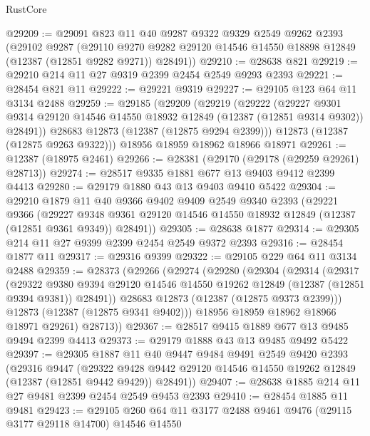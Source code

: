 \begin{lexlean}{RustCore}
\begin{coremodule}
@29209 := @29091
    @823
    @11
    @40
    @9287
    @9322
    @9329
    @2549
    @9262
    @2393
    (@29102
      @9287
      (@29110 @9270 @9282 @29120 @14546 @14550 @18898 @12849 (@12387 (@12851 @9282 @9271)) @28491))
@29210 := @28638 @821
@29219 := @29210 @214 @11 @27 @9319 @2399 @2454 @2549 @9293 @2393
@29221 := @28454 @821 @11
@29222 := @29221 @9319
@29227 := @29105 @123 @64 @11 @3134 @2488
@29259 := @29185
    (@29209
      (@29219
        (@29222
          (@29227
            @9301
            @9314
            @29120
            @14546
            @14550
            @18932
            @12849
            (@12387 (@12851 @9314 @9302))
            @28491))
        @28683
        @12873
        (@12387 (@12875 @9294 @2399)))
      @12873
      (@12387 (@12875 @9263 @9322)))
    @18956
    @18959
    @18962
    @18966
    @18971
@29261 := @12387 (@18975 @2461)
@29266 := @28381 (@29170 (@29178 (@29259 @29261) @28713))
@29274 := @28517 @9335 @1881 @677 @13 @9403 @9412 @2399 @4413
@29280 := @29179 @1880 @43 @13 @9403 @9410 @5422
@29304 := @29210
    @1879
    @11
    @40
    @9366
    @9402
    @9409
    @2549
    @9340
    @2393
    (@29221
      @9366
      (@29227 @9348 @9361 @29120 @14546 @14550 @18932 @12849 (@12387 (@12851 @9361 @9349)) @28491))
@29305 := @28638 @1877
@29314 := @29305 @214 @11 @27 @9399 @2399 @2454 @2549 @9372 @2393
@29316 := @28454 @1877 @11
@29317 := @29316 @9399
@29322 := @29105 @229 @64 @11 @3134 @2488
@29359 := @28373
    (@29266
      (@29274
        (@29280
          (@29304
            (@29314
              (@29317
                (@29322
                  @9380
                  @9394
                  @29120
                  @14546
                  @14550
                  @19262
                  @12849
                  (@12387 (@12851 @9394 @9381))
                  @28491))
              @28683
              @12873
              (@12387 (@12875 @9373 @2399)))
            @12873
            (@12387 (@12875 @9341 @9402)))
          @18956
          @18959
          @18962
          @18966
          @18971
          @29261)
        @28713))
@29367 := @28517 @9415 @1889 @677 @13 @9485 @9494 @2399 @4413
@29373 := @29179 @1888 @43 @13 @9485 @9492 @5422
@29397 := @29305
    @1887
    @11
    @40
    @9447
    @9484
    @9491
    @2549
    @9420
    @2393
    (@29316
      @9447
      (@29322 @9428 @9442 @29120 @14546 @14550 @19262 @12849 (@12387 (@12851 @9442 @9429)) @28491))
@29407 := @28638 @1885 @214 @11 @27 @9481 @2399 @2454 @2549 @9453 @2393
@29410 := @28454 @1885 @11 @9481
@29423 := @29105 @260 @64 @11 @3177 @2488 @9461 @9476 (@29115 @3177 @29118 @14700) @14546 @14550

\end{coremodule}
\end{lexlean}
